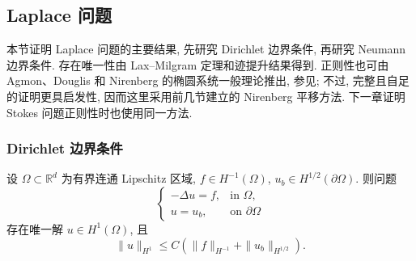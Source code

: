 \renewcommand{\thestatement}{4.\number\numexpr\value{statement}-78\relax}
\renewcommand{\thechapterthreesectionfourremark}{4.\arabic{chapterthreesectionfourremark}}

\subsection{Laplace 问题}
\label{sec:chap3-laplace-problem}

本节证明 Laplace 问题的主要结果, 先研究 Dirichlet 边界条件, 再研究 Neumann 边界条件. 存在唯一性由 Lax--Milgram 定理和迹提升结果得到. 正则性也可由 Agmon、Douglis 和 Nirenberg 的椭圆系统一般理论推出, 参见; 不过, 完整且自足的证明更具启发性, 因而这里采用前几节建立的 Nirenberg 平移方法. 下一章证明 Stokes 问题正则性时也使用同一方法.

\subsubsection{Dirichlet 边界条件}
\label{subsec:chap3-laplace-dirichlet}

\begin{Theorem}
\label{thm:chap3-laplace-dirichlet-wellposedness}
设 $\Omega\subset\mathbb R^d$ 为有界连通 Lipschitz 区域, $f\in H^{-1}(\Omega)$, $u_b\in H^{1/2}(\partial\Omega)$. 则问题
\begin{equation}
 \begin{cases}
 -\Delta u=f,&\text{in }\Omega,\\
 u=u_b,&\text{on }\partial\Omega
 \end{cases}
 \label{eq:chap3-laplace-dirichlet-problem}
\end{equation}
存在唯一解 $u\in H^1(\Omega)$, 且
\[
 \|u\|_{H^1}\leq C(\|f\|_{H^{-1}}+\|u_b\|_{H^{1/2}}).
\]
\end{Theorem}

